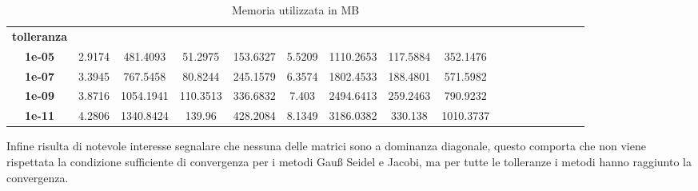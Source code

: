 \begin{table}[!ht]
\begin{subtable}[!ht]{1\textwidth}
{\begin{tabular}{|c|c|c|c|c|c|c|c|c|c|c|c|c|c|c|c|c|}
                \textbf{tolleranza} & ~                 & ~                 & ~             & ~             & ~                 & ~                 & ~             & ~             \\
                \textbf{1e-05}      & 2.9174            & 481.4093          & 51.2975       & 153.6327      & 5.5209            & 1110.2653         & 117.5884      & 352.1476      \\
                \textbf{1e-07}      & 3.3945            & 767.5458          & 80.8244       & 245.1579      & 6.3574            & 1802.4533         & 188.4801      & 571.5982      \\
                \textbf{1e-09}      & 3.8716            & 1054.1941         & 110.3513      & 336.6832      & 7.403             & 2494.6413         & 259.2463      & 790.9232      \\
                \textbf{1e-11}      & 4.2806            & 1340.8424         & 139.96        & 428.2084      & 8.1349            & 3186.0382         & 330.138       & 1010.3737     \\
            \end{tabular}
        }
        \caption{Vem 1 e Vem 2}
        \label{tab:vem_mem}
    \end{subtable}
    \caption{Memoria utilizzata in MB}
    \label{tab:memory}
\end{table}

Infine risulta di notevole interesse segnalare che nessuna delle matrici sono a
dominanza diagonale, questo comporta che non viene rispettata la condizione sufficiente
di convergenza per i metodi Gauß Seidel e Jacobi, ma per tutte le tolleranze i metodi
hanno raggiunto la convergenza.

